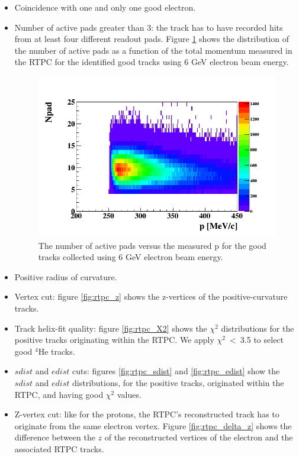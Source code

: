 \begin{itemize}
\item Coincidence with one and only one good electron.  
\item Number of active pads greater than 3: the track has to have recorded hits 
   from at least four different readout pads. Figure \ref{fig:padnb} shows the 
   distribution of the number of active pads as a function of the total 
   momentum measured in the RTPC for the identified good tracks using 6 GeV 
   electron beam energy.
   
   \begin{figure}[tbp]
      \centering
      \includegraphics[height=7.2cm]{fig_analysis/npd_p.png}
      \caption{The number of active pads versus the measured p for the good 
      tracks collected using 6 GeV electron beam energy.}
      \label{fig:padnb}
   \end{figure}

\item Positive radius of curvature. 

\item Vertex cut: figure \ref{fig:rtpc_z} shows the z-vertices of the 
   positive-curvature tracks.

\item Track helix-fit quality: figure \ref{fig:rtpc_X2} shows the $\chi^{2}$ 
   distributions for the positive tracks originating within the RTPC. We apply 
   $\chi^{2}$~<~3.5 to select good $^4$He tracks.

\item $sdist$ and $edist$ cuts: figures \ref{fig:rtpc_sdist} and \ref{fig:rtpc_edist} show the $sdist$ and $edist$ distributions, for the positive tracks, originated within the RTPC, and having good $\chi^{2}$ values.

\item Z-vertex cut: like for the protons, the RTPC's reconstructed track has to originate from the same electron vertex. Figure \ref{fig:rtpc_delta_z} shows the difference between the $z$ of the reconstructed vertices of the electron and the associated RTPC tracks. 


\end{itemize}
